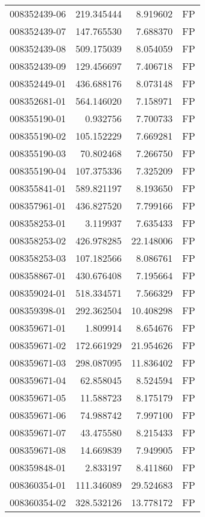 \begin{tabular}{lrrl}
008352439-06 &  219.345444 &     8.919602 &   FP \\
008352439-07 &  147.765530 &     7.688370 &   FP \\
008352439-08 &  509.175039 &     8.054059 &   FP \\
008352439-09 &  129.456697 &     7.406718 &   FP \\
008352449-01 &  436.688176 &     8.073148 &   FP \\
008352681-01 &  564.146020 &     7.158971 &   FP \\
008355190-01 &    0.932756 &     7.700733 &   FP \\
008355190-02 &  105.152229 &     7.669281 &   FP \\
008355190-03 &   70.802468 &     7.266750 &   FP \\
008355190-04 &  107.375336 &     7.325209 &   FP \\
008355841-01 &  589.821197 &     8.193650 &   FP \\
008357961-01 &  436.827520 &     7.799166 &   FP \\
008358253-01 &    3.119937 &     7.635433 &   FP \\
008358253-02 &  426.978285 &    22.148006 &   FP \\
008358253-03 &  107.182566 &     8.086761 &   FP \\
008358867-01 &  430.676408 &     7.195664 &   FP \\
008359024-01 &  518.334571 &     7.566329 &   FP \\
008359398-01 &  292.362504 &    10.408298 &   FP \\
008359671-01 &    1.809914 &     8.654676 &   FP \\
008359671-02 &  172.661929 &    21.954626 &   FP \\
008359671-03 &  298.087095 &    11.836402 &   FP \\
008359671-04 &   62.858045 &     8.524594 &   FP \\
008359671-05 &   11.588723 &     8.175179 &   FP \\
008359671-06 &   74.988742 &     7.997100 &   FP \\
008359671-07 &   43.475580 &     8.215433 &   FP \\
008359671-08 &   14.669839 &     7.949905 &   FP \\
008359848-01 &    2.833197 &     8.411860 &   FP \\
008360354-01 &  111.346089 &    29.524683 &   FP \\
008360354-02 &  328.532126 &    13.778172 &   FP \\

\end{tabular}
